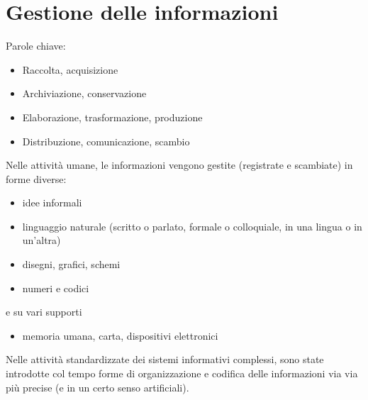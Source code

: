 \section{Gestione delle informazioni}
Parole chiave:
\begin{itemize}
    \item Raccolta, acquisizione
    \item Archiviazione, conservazione
    \item Elaborazione, trasformazione, produzione
    \item Distribuzione, comunicazione, scambio
\end{itemize}

Nelle attività umane, le informazioni vengono gestite (registrate e scambiate) in forme diverse:
\begin{itemize}
    \item idee informali
    \item linguaggio naturale (scritto o parlato, formale o colloquiale, in una lingua o in un'altra)
    \item disegni, grafici, schemi
    \item numeri e codici
\end{itemize}
e su vari supporti
\begin{itemize}
    \item memoria umana, carta, dispositivi elettronici
\end{itemize}
Nelle attività standardizzate dei sistemi informativi complessi, sono state introdotte col tempo forme di organizzazione e codifica delle informazioni via via più precise (e in un certo senso artificiali).

